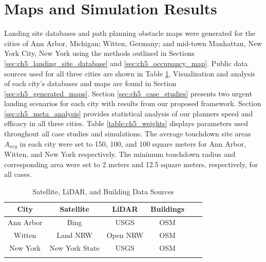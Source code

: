 \section{Maps and Simulation Results}\label{sec:ch5_experiments}

Landing site databases and path planning obstacle maps were generated for the cities of Ann Arbor, Michigan; Witten, Germany; and mid-town Manhattan, New York City, New York using the methods outlined in Sections \ref{sec:ch5_landing_site_database} and \ref{sec:ch5_occupancy_map}. Public data sources used for all three cities are shown in Table \ref{table:ch5_data_sources}. Visualization and analysis of each city's databases and maps are found in Section \ref{sec:ch5_generated_maps}. Section \ref{sec:ch5_case_studies} presents two urgent landing scenarios for each city with results from our proposed framework. Section \ref{sec:ch5_meta_analysis} provides statistical analysis of our planners speed and efficacy in all three cities. Table \ref{table:ch5_weights} displays parameters used throughout all case studies and simulations. The average touchdown site areas $A_{avg}$ in each city were set to 150, 100, and 100 square meters for Ann Arbor, Witten, and New York respectively. The minimum touchdown radius and corresponding area were set to 2 meters and 12.5 square meters, respectively, for all cases.

\begin{table}[ht]
\centering
\caption{Satellite, LiDAR, and Building Data Sources}\label{table:ch5_data_sources}
\begin{tabular}{c@{\qquad}cc@{\qquad}cc@{\qquad}c}
  \hline\noalign{\smallskip}
  City & Satellite & LiDAR & Buildings \\
  \hline\noalign{\smallskip}
  Ann Arbor & Bing \cite{satellite_annarbor}            & USGS \cite{usgs_lidar_2018-annarbor}       & OSM \cite{openstreetmap_contributors_planet_2017}  \\
  Witten    & Land NRW \cite{satellite_germany}         & Open NRW \cite{lidar_germany}    & OSM \cite{openstreetmap_contributors_planet_2017}  \\
  New York  & New York State \cite{satellite_newyork}   & USGS \cite{usgs_lidar_2018_ny}        & OSM \cite{openstreetmap_contributors_planet_2017}  \\
\noalign{\smallskip}\hline\noalign{\smallskip}
\end{tabular}
\end{table}


